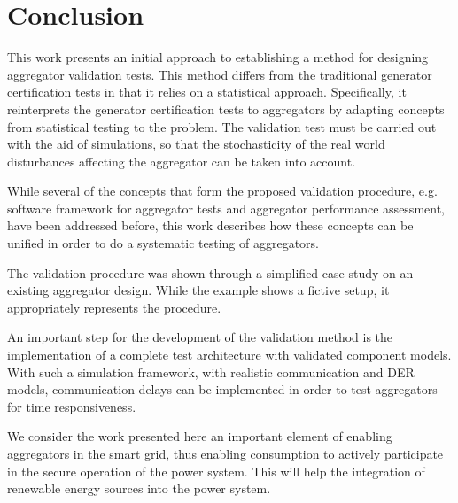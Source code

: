 \section{Conclusion}
This work presents an initial approach to establishing a method for designing aggregator validation tests. This method differs from the traditional generator certification tests in that it relies on a statistical approach. Specifically, it reinterprets the generator certification tests to aggregators by adapting concepts from statistical testing to the problem. The validation test must be carried out with the aid of simulations, so that the stochasticity of the real world disturbances affecting the aggregator can be taken into account. 

While several of the concepts that form the proposed validation procedure, e.g. software framework for aggregator tests and aggregator performance assessment, have been addressed before, this work describes how these concepts can be unified in order to do a systematic testing of aggregators.

The validation procedure was shown through a simplified case study on an existing aggregator design. While the example shows a fictive setup, it appropriately represents the procedure.

An important step for the development of the validation method is the implementation of a complete test architecture with validated component models. With such a simulation framework, with realistic communication and DER models, communication delays can be implemented in order to test aggregators for time responsiveness. 

We consider the work presented here an important element of enabling aggregators in the smart grid, thus enabling consumption to actively participate in the secure operation of the power system. This will help the integration of renewable energy sources into the power system.
